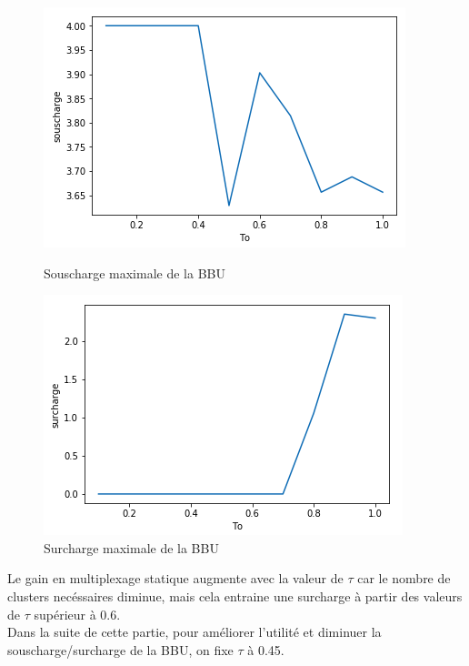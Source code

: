 \documentclass{report}
\begin{document}
\begin{figure}[H]
  \begin{minipage}{0.4\textwidth}
    \centering
    \includegraphics[scale=0.55]{images/souscharge_to.png}
    \caption{Souscharge maximale de la BBU}\label{Fig:Data1}
  \end{minipage}\hfill
  \begin{minipage}{0.4\textwidth}
    \centering
    \includegraphics[scale=0.55]{images/surcharge_to.png}
    \caption{Surcharge maximale de la BBU}\label{Fig:Data2}
  \end{minipage}
\end{figure}

Le gain en multiplexage statique augmente avec la valeur de $\tau$ car le nombre de clusters necéssaires diminue, mais cela entraine 
une surcharge à partir des valeurs de $\tau$ supérieur à 0.6.\\
Dans la suite de cette partie, pour améliorer l'utilité et diminuer la souscharge/surcharge de la BBU, on fixe $\tau$ à 0.45.  
\end{document}

